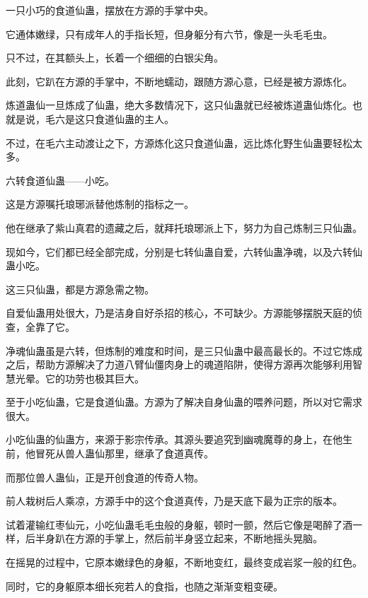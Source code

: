 
\begin{this_body}



一只小巧的食道仙蛊，摆放在方源的手掌中央。

它通体嫩绿，只有成年人的手指长短，但身躯分有六节，像是一头毛毛虫。

只不过，在其额头上，长着一个细细的白银尖角。

此刻，它趴在方源的手掌中，不断地蠕动，跟随方源心意，已经是被方源炼化。

炼道蛊仙一旦炼成了仙蛊，绝大多数情况下，这只仙蛊就已经被炼道蛊仙炼化。也就是说，毛六是这只食道仙蛊的主人。

不过，在毛六主动渡让之下，方源炼化这只食道仙蛊，远比炼化野生仙蛊要轻松太多。

六转食道仙蛊——小吃。

这是方源嘱托琅琊派替他炼制的指标之一。

他在继承了紫山真君的遗藏之后，就拜托琅琊派上下，努力为自己炼制三只仙蛊。

现如今，它们都已经全部完成，分别是七转仙蛊自爱，六转仙蛊净魂，以及六转仙蛊小吃。

这三只仙蛊，都是方源急需之物。

自爱仙蛊用处很大，乃是洁身自好杀招的核心，不可缺少。方源能够摆脱天庭的侦查，全靠了它。

净魂仙蛊虽是六转，但炼制的难度和时间，是三只仙蛊中最高最长的。不过它炼成之后，帮助方源解决了力道八臂仙僵肉身上的魂道陷阱，使得方源再次能够利用智慧光晕。它的功劳也极其巨大。

至于小吃仙蛊，它是食道仙蛊。方源为了解决自身仙蛊的喂养问题，所以对它需求很大。

小吃仙蛊的仙蛊方，来源于影宗传承。其源头要追究到幽魂魔尊的身上，在他生前，他冒死从兽人蛊仙那里，继承了食道真传。

而那位兽人蛊仙，正是开创食道的传奇人物。

前人栽树后人乘凉，方源手中的这个食道真传，乃是天底下最为正宗的版本。

试着灌输红枣仙元，小吃仙蛊毛毛虫般的身躯，顿时一颤，然后它像是喝醉了酒一样，后半身趴在方源的手掌上，然后前半身竖立起来，不断地摇头晃脑。

在摇晃的过程中，它原本嫩绿色的身躯，不断地变红，最终变成岩浆一般的红色。

同时，它的身躯原本细长宛若人的食指，也随之渐渐变粗变硬。


\end{this_body}
